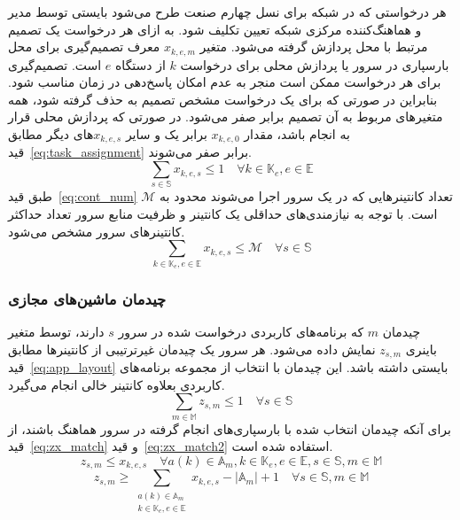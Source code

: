 هر درخواستی که در شبکه  برای نسل چهارم صنعت طرح می‌شود بایستی توسط مدیر و هماهنگ‌کننده مرکزی شبکه تعیین تکلیف شود. به ازای هر درخواست یک تصمیم مرتبط با محل پردازش گرفته می‌شود. متغیر $x_{k,e,m}$ معرف تصمیم‌گیری برای محل  بارسپاری در سرور یا پردازش محلی برای درخواست $k$ از دستگاه $e$ است. تصمیم‌گیری برای هر درخواست ممکن است منجر به عدم امکان پاسخ‌دهی در زمان مناسب شود. بنابراین در صورتی که برای یک درخواست مشخص تصمیم به حذف گرفته شود، همه متغیرهای مربوط به آن تصمیم برابر صفر می‌شود. در صورتی که پردازش محلی قرار به انجام باشد، مقدار $x_{k,e,0}$ برابر یک و سایر $x_{k,e,s}$های دیگر مطابق قید~\eqref{eq:task_assignment} برابر صفر می‌شوند.
\begin{equation} \label{eq:task_assignment}
    \sum_{s \in \mathbb{S}} x_{k,e,s} \leq 1 \quad \forall k \in \mathbb{K}_e, e \in \mathbb{E}
\end{equation}
طبق قید‍~\eqref{eq:cont_num} تعداد کانتینرهایی که در یک سرور اجرا می‌شوند محدود به $\mathcal{M}$ است. با توجه به نیازمندی‌های حداقلی یک کانتینر و ظرفیت منابع سرور تعداد حداکثر کانتینرهای سرور مشخص می‌شود.
\begin{equation} \label{eq:cont_num}
    \sum_{k \in \mathbb{K}_e, e \in \mathbb{E}} x_{k,e,s} \leq \mathcal{M} \quad \forall s \in \mathbb{S}
\end{equation}

\subsubsection{چیدمان ماشین‌های مجازی}
چیدمان $m$ که برنامه‌های کاربردی درخواست شده در سرور $s$ دارند، توسط متغیر باینری $z_{s,m}$ نمایش داده می‌شود. هر سرور یک چیدمان غیرترتیبی از کانتینرها مطابق قید~\eqref{eq:app_layout} بایستی داشته باشد. این چیدمان با انتخاب از مجموعه برنامه‌های کاربردی بعلاوه کانتینر خالی انجام می‌گیرد.
\begin{equation} \label{eq:app_layout}
    \sum_{m \in \mathbb{M}} z_{s,m} \leq 1 \quad \forall s \in \mathbb{S}
\end{equation}
برای آنکه چیدمان انتخاب شده با بارسپاری‌های انجام گرفته در سرور هماهنگ باشند، از قید~\eqref{eq:zx_match} و قید~\eqref{eq:zx_match2} استفاده شده است.
\begin{equation} \label{eq:zx_match}
    z_{s,m} \leq x_{k,e,s} \quad \forall a(k) \in \mathbb{A}_m, k \in \mathbb{K}_e, e \in \mathbb{E}, s \in \mathbb{S}, m \in \mathbb{M}
\end{equation}
\begin{equation} \label{eq:zx_match2}
    z_{s,m} \geq \sum_{\substack{a(k) \in \mathbb{A}_m \\ k \in \mathbb{K}_e, e \in \mathbb{E}}}x_{k,e,s} - |\mathbb{A}_m| + 1 \quad \forall s \in \mathbb{S}, m \in \mathbb{M}
\end{equation}

